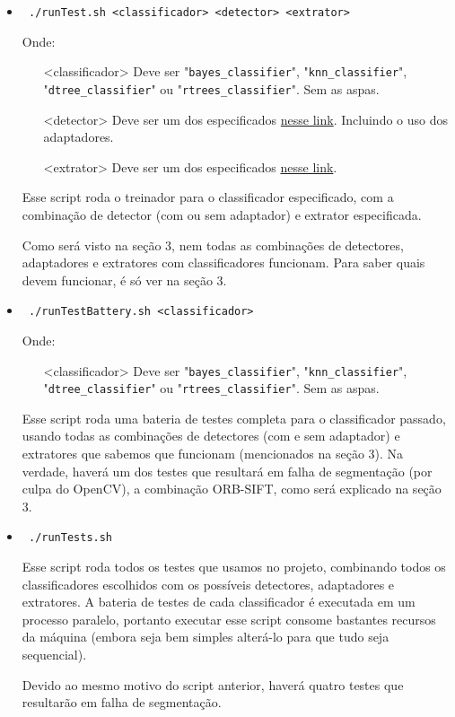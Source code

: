 \documentclass[a4paper,11pt]{article}
\begin{document}
    \begin{itemize}
      \item \verb| ./runTest.sh <classificador> <detector> <extrator> |

      Onde:
      \begin{itemize}
        \item[<classificador>]
          Deve ser "\verb$bayes_classifier$", "\verb$knn_classifier$", \\
          "\verb$dtree_classifier$" ou "\verb$rtrees_classifier$". Sem as aspas.
        \item[<detector>]
          Deve ser um dos especificados \href{
          http://docs.opencv.org/modules/features2d/doc/common_interfaces_of_feature_detectors.html#featuredetector-create
          }{nesse link}. Incluindo o uso dos adaptadores.
        \item[<extrator>]
          Deve ser um dos especificados \href{
          http://docs.opencv.org/modules/features2d/doc/common_interfaces_of_descriptor_extractors.html#descriptorextractor-create
          }{nesse link}.
      \end{itemize}
      Esse script roda o treinador para o classificador especificado, com a
      combinação de detector (com ou sem adaptador) e extrator especificada.

      Como será visto na seção 3, nem todas as combinações de detectores,
      adaptadores e extratores com classificadores funcionam. Para saber quais
      devem funcionar, é só ver na seção 3.

      \item \verb| ./runTestBattery.sh <classificador>|

      Onde:
      \begin{itemize}
        \item[<classificador>]
          Deve ser "\verb$bayes_classifier$", "\verb$knn_classifier$", \\
          "\verb$dtree_classifier$" ou "\verb$rtrees_classifier$". Sem as aspas.
      \end{itemize}
      Esse script roda uma bateria de testes completa para o classificador
      passado, usando todas as combinações de detectores (com e sem adaptador)
      e extratores que sabemos que funcionam (mencionados na seção 3). Na
      verdade, haverá um dos testes que resultará em falha de segmentação (por
      culpa do OpenCV), a combinação ORB-SIFT, como será explicado na seção 3.


      \item \verb| ./runTests.sh|

      Esse script roda todos os testes que usamos no projeto, combinando todos
      os classificadores escolhidos com os possíveis detectores, adaptadores e
      extratores. A bateria de testes de cada classificador é executada em um
      processo paralelo, portanto executar esse script consome bastantes
      recursos da máquina (embora seja bem simples alterá-lo para que tudo seja
      sequencial).

      Devido ao mesmo motivo do script anterior, haverá quatro testes que
      resultarão em falha de segmentação.
    \end{itemize}
\end{document}
